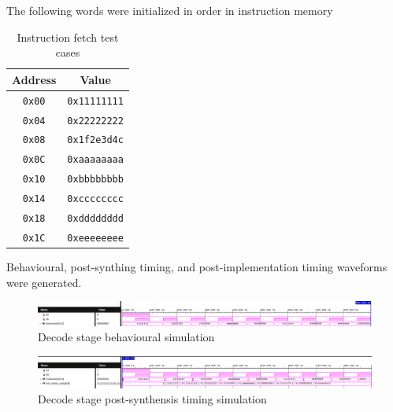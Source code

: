 \documentclass[CMPE]{../KGCOEReport}
\def\code#1{\texttt{#1}}
\begin{document}
    The following words were initialized in order in instruction memory
    \begin{table}[H]
        \renewcommand{\arraystretch}{1.2}
        \setlength{\tabcolsep}{12pt}
        \caption{Instruction fetch test cases}
        \begin{center}
            \begin{tabular}{|c|c|}
                \hline
                Address & Value\\\hline
                \hline
               	\code{0x00} & \code{0x11111111}\\\hline
               	\code{0x04} & \code{0x22222222}\\\hline
               	\code{0x08} & \code{0x1f2e3d4c}\\\hline
               	\code{0x0C} & \code{0xaaaaaaaa}\\\hline
               	\code{0x10} & \code{0xbbbbbbbb}\\\hline
               	\code{0x14} & \code{0xcccccccc}\\\hline
               	\code{0x18} & \code{0xdddddddd}\\\hline
               	\code{0x1C} & \code{0xeeeeeeee}\\\hline
               	
            \end{tabular}
        \end{center}
        \label{tab:inst_mem}
    \end{table}

    Behavioural, post-synthing timing, and post-implementation
    timing waveforms were generated.

    \begin{figure}[h!]
        \centering
        \includegraphics[width=\textwidth]{img/behavior_fetch}
        \caption{Decode stage behavioural simulation}
        \label{fig:behave_fetch}
    \end{figure}

    \begin{figure}[h!]
        \centering
        \includegraphics[width=\textwidth]{img/synthesis_fetch}
        \caption{Decode stage post-synthensis timing simulation}
        \label{fig:synth_fetch}
    \end{figure}
\end{document}
